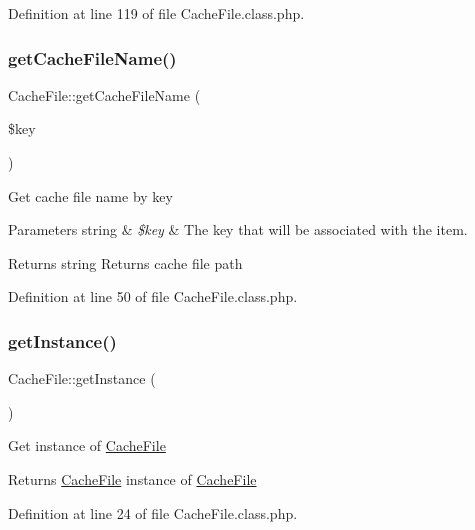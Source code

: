 Definition at line 119 of file Cache\+File.\+class.\+php.

\mbox{\label{classCacheFile_a15ca23dea98604dc2e6d067f9ce48242}} 
\subsubsection{\texorpdfstring{get\+Cache\+File\+Name()}{getCacheFileName()}}
{\footnotesize\ttfamily Cache\+File\+::get\+Cache\+File\+Name (\begin{DoxyParamCaption}\item[{}]{\$key }\end{DoxyParamCaption})}

Get cache file name by key


\begin{DoxyParams}[1]{Parameters}
string & {\em \$key} & The key that will be associated with the item. \\
\hline
\end{DoxyParams}
\begin{DoxyReturn}{Returns}
string Returns cache file path 
\end{DoxyReturn}


Definition at line 50 of file Cache\+File.\+class.\+php.

\mbox{\label{classCacheFile_a5389ea809c31aed387c12eb37b2677b8}} 
\subsubsection{\texorpdfstring{get\+Instance()}{getInstance()}}
{\footnotesize\ttfamily Cache\+File\+::get\+Instance (\begin{DoxyParamCaption}{ }\end{DoxyParamCaption})}

Get instance of \hyperlink{classCacheFile}{Cache\+File}

\begin{DoxyReturn}{Returns}
\hyperlink{classCacheFile}{Cache\+File} instance of \hyperlink{classCacheFile}{Cache\+File} 
\end{DoxyReturn}


Definition at line 24 of file Cache\+File.\+class.\+php.

